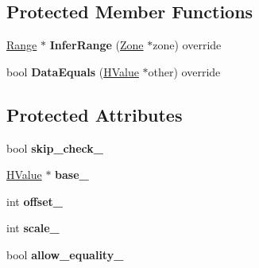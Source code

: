 \subsection*{Protected Member Functions}
\begin{DoxyCompactItemize}
\item 
\hyperlink{classv8_1_1internal_1_1_range}{Range} $\ast$ {\bfseries Infer\+Range} (\hyperlink{classv8_1_1internal_1_1_zone}{Zone} $\ast$zone) override\hypertarget{classv8_1_1internal_1_1_h_bounds_check_a668fbb6ab69afcdf1dd98b9ad7783db2}{}\label{classv8_1_1internal_1_1_h_bounds_check_a668fbb6ab69afcdf1dd98b9ad7783db2}

\item 
bool {\bfseries Data\+Equals} (\hyperlink{classv8_1_1internal_1_1_h_value}{H\+Value} $\ast$other) override\hypertarget{classv8_1_1internal_1_1_h_bounds_check_a33a22d753cc2d79b8f195a3467642cd6}{}\label{classv8_1_1internal_1_1_h_bounds_check_a33a22d753cc2d79b8f195a3467642cd6}

\end{DoxyCompactItemize}
\subsection*{Protected Attributes}
\begin{DoxyCompactItemize}
\item 
bool {\bfseries skip\+\_\+check\+\_\+}\hypertarget{classv8_1_1internal_1_1_h_bounds_check_aa889e4ef5b95c6f2f35cc5b3424b8f1c}{}\label{classv8_1_1internal_1_1_h_bounds_check_aa889e4ef5b95c6f2f35cc5b3424b8f1c}

\item 
\hyperlink{classv8_1_1internal_1_1_h_value}{H\+Value} $\ast$ {\bfseries base\+\_\+}\hypertarget{classv8_1_1internal_1_1_h_bounds_check_acb8772d95869566e3250521296859a50}{}\label{classv8_1_1internal_1_1_h_bounds_check_acb8772d95869566e3250521296859a50}

\item 
int {\bfseries offset\+\_\+}\hypertarget{classv8_1_1internal_1_1_h_bounds_check_a6f66289fa8b05f18160c45e7a3ec1c6e}{}\label{classv8_1_1internal_1_1_h_bounds_check_a6f66289fa8b05f18160c45e7a3ec1c6e}

\item 
int {\bfseries scale\+\_\+}\hypertarget{classv8_1_1internal_1_1_h_bounds_check_aa8b178d99b23bf479be2ea1be1a4a9f6}{}\label{classv8_1_1internal_1_1_h_bounds_check_aa8b178d99b23bf479be2ea1be1a4a9f6}

\item 
bool {\bfseries allow\+\_\+equality\+\_\+}\hypertarget{classv8_1_1internal_1_1_h_bounds_check_a89e9dc8fac2d51ad6f7e81e5583303b1}{}\label{classv8_1_1internal_1_1_h_bounds_check_a89e9dc8fac2d51ad6f7e81e5583303b1}

\end{DoxyCompactItemize}
